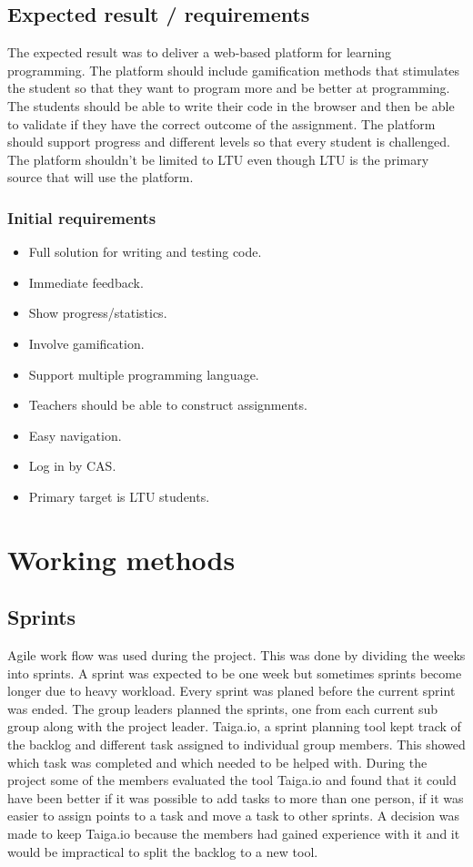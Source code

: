 \documentclass[a4paper,12pt]{article}
\begin{document}
\subsection{Expected result / requirements}  
The expected result was to deliver a web-based platform for learning programming. The platform should include gamification methods that stimulates the student so that they want to program more and be better at programming. The students should be able to write their code in the browser and then be able to validate if they have the correct outcome of the assignment. The platform should support progress and different levels so that every student is challenged. The platform shouldn't be limited to LTU even though LTU is the primary source that will use the platform. 

\subsubsection{Initial requirements} 
 \begin{itemize}
\item Full solution for writing and testing code.
\item Immediate feedback.
\item Show progress/statistics.
\item Involve gamification.
\item Support multiple programming language.
\item Teachers should be able to construct assignments.
\item Easy navigation.
\item Log in by CAS. 
\item Primary target is LTU students.
 \end{itemize}


\section{Working methods}
\subsection{Sprints} 
Agile work flow was used during the project. This was done by dividing the weeks into sprints. A sprint was expected to be one week but sometimes sprints become longer due to heavy workload. Every sprint was planed before the current sprint was ended. The group leaders planned the sprints, one from each current sub group along with the project leader. Taiga.io, a sprint planning tool kept track of the backlog and different task assigned to individual group members. This showed which task was completed and which needed to be helped with. During the project some of the members evaluated the tool Taiga.io and found that it could have been better if it was possible to add tasks to more than one person, if it was easier to assign points to a task and move a task to other sprints. A decision was made to keep Taiga.io because the members had gained experience with it and it would be impractical to split the backlog to a new tool.
\end{document}
